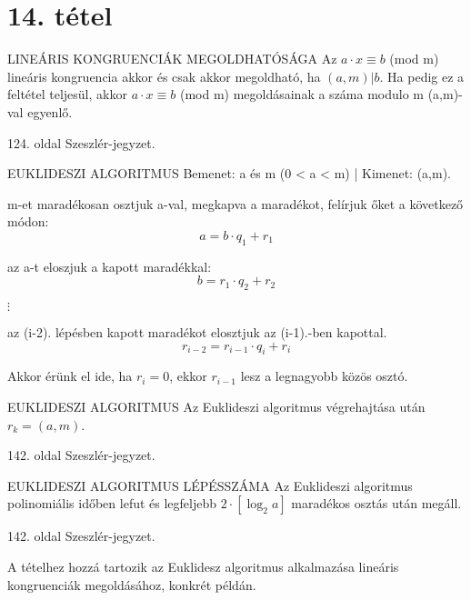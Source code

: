 \section{14. tétel}

\begin{tetel}{LINEÁRIS KONGRUENCIÁK MEGOLDHATÓSÁGA}
Az $a \cdot x \equiv b$ (mod m) lineáris kongruencia akkor és csak akkor megoldható, ha $(a,m)|b$. Ha pedig ez a feltétel teljesül, akkor  $a \cdot x \equiv b$ (mod m) megoldásainak a száma modulo m (a,m)-val egyenlő.
\end{tetel}

\begin{bizonyitas}{}
124. oldal Szeszlér-jegyzet.
\end{bizonyitas}

\begin{tetel}{EUKLIDESZI ALGORITMUS}
Bemenet: a és m (0 < a < m) | Kimenet: (a,m).
\begin{description}
\item[1. lépés:]m-et maradékosan osztjuk a-val, megkapva a maradékot, felírjuk őket a következő módon:
$$a = b\cdot q_1 + r_1$$
\item[2. lépés:]az a-t eloszjuk a kapott maradékkal:
$$b = r_1\cdot q_2 + r_2$$
\item $\vdots$
\item[i. lépés:] az (i-2). lépésben kapott maradékot elosztjuk az (i-1).-ben kapottal.
$$r_{i-2} = r_{i-1}\cdot q_i + r_i$$
\item[Utolsó lépés] Akkor érünk el ide, ha $r_i = 0$, ekkor $r_{i-1}$ lesz a legnagyobb közös osztó.
\end{description}
\end{tetel}

\begin{tetel}{EUKLIDESZI ALGORITMUS}
Az Euklideszi algoritmus végrehajtása után $r_k = (a,m)$.
\end{tetel}

\begin{bizonyitas}{}
142. oldal Szeszlér-jegyzet.
\end{bizonyitas}

\begin{tetel}{EUKLIDESZI ALGORITMUS LÉPÉSSZÁMA}
Az Euklideszi algoritmus polinomiális időben lefut és legfeljebb $2 \cdot [\log_2a]$ maradékos osztás után megáll.
\end{tetel}

\begin{bizonyitas}{}
142. oldal Szeszlér-jegyzet.
\end{bizonyitas}

A tételhez hozzá tartozik az Euklidesz algoritmus alkalmazása lineáris kongruenciák megoldásához, konkrét példán.
